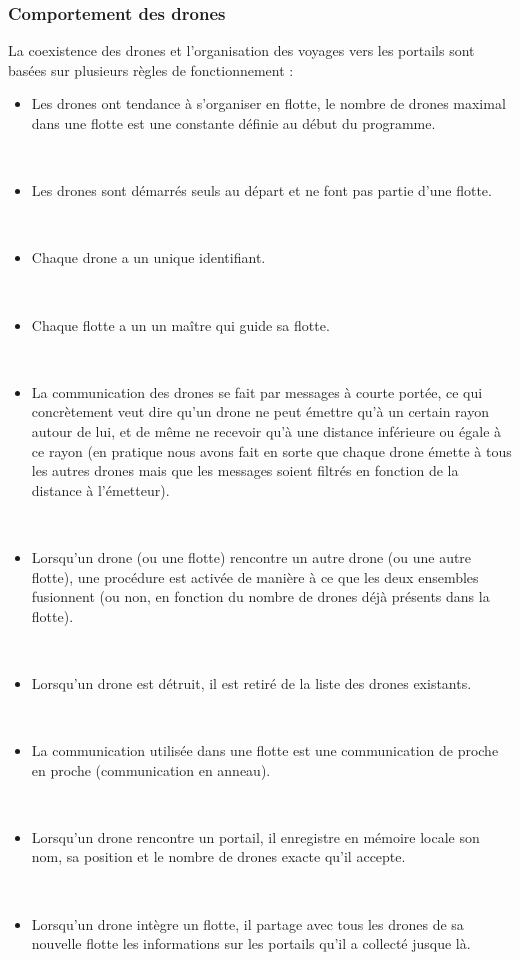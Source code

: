 \documentclass[11pt]{report}
\begin{document}
\subsubsection{Comportement des drones}

La coexistence des drones et l'organisation des voyages vers les portails sont basées sur plusieurs règles de fonctionnement : 

\begin{itemize}
\item Les drones ont tendance à s'organiser en flotte, le nombre de drones maximal dans une flotte est une constante définie au début du programme.

~\
\item Les drones sont démarrés seuls au départ et ne font pas partie d'une flotte.

~\
\item Chaque drone a un unique identifiant.

~\
\item Chaque flotte a un un maître qui guide sa flotte.

~\
\item La communication des drones se fait par messages à courte portée, ce qui concrètement veut dire qu'un drone ne peut émettre qu'à un certain rayon autour de lui, et de même ne recevoir qu'à une distance inférieure ou égale à ce rayon (en pratique nous avons fait en sorte que chaque drone émette à tous les autres drones mais que les messages soient filtrés en fonction de la distance à l'émetteur).

~\
\item Lorsqu'un drone (ou une flotte) rencontre un autre drone (ou une autre flotte), une procédure est activée de manière à ce que les deux ensembles fusionnent (ou non, en fonction du nombre de drones déjà présents dans la flotte).

~\
\item Lorsqu'un drone est détruit, il est retiré de la liste des drones existants.

~\
\item La communication utilisée dans une flotte est une communication de proche en proche (communication en anneau).

~\
\item Lorsqu'un drone rencontre un portail, il enregistre en mémoire locale son nom, sa position et le nombre de drones exacte qu'il accepte.

~\
\item Lorsqu'un drone intègre un flotte, il partage avec tous les drones de sa nouvelle flotte les informations sur les portails qu'il a collecté jusque là.


\end{itemize}
\end{document}
